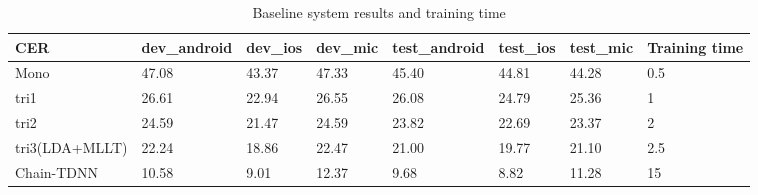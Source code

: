 \documentclass[a4paper]{article}
\begin{document}
\begin{table}[th]
  \caption{Baseline system results and training time}
  \label{tab:base}
  \centering
  \begin{tabular}{ llllllll }
    \toprule
    CER               &  dev\_android           &  dev\_ios           &  dev\_mic           & test\_android            &  test\_ios           &  test\_mic          &  Training time         \\
    \midrule
    Mono        &  47.08                 &  43.37             &  47.33             &  45.40                  &  44.81              &  44.28             &  0.5                   \\
    tri1    &  26.61                 &  22.94             &  26.55             &  26.08                  &  24.79              &  25.36             &  1                     \\
    tri2    &  24.59                 &  21.47             &  24.59             &  23.82                 &  22.69              &  23.37             &  2                     \\
    tri3(LDA+MLLT)          &  22.24                 &  18.86             &  22.47             &  21.00                  &  19.77              &  21.10             &  2.5                   \\
    Chain-TDNN              &  10.58                 &  9.01             &  12.37         &  9.68                  &  8.82             &  11.28              &  15                    \\
    \bottomrule
  \end{tabular}
\end{table}

\end{document}
